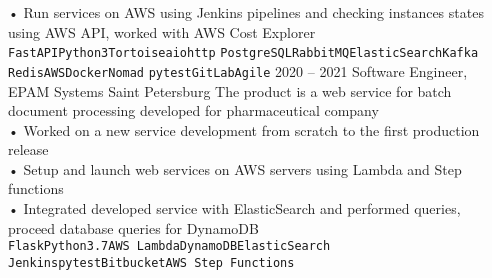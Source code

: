 {\begin{entrylist}
{            • Run services on AWS using Jenkins pipelines and checking instances states using AWS API, worked with AWS Cost Explorer \\
			\texttt{FastAPI}\slashsep\texttt{Python3}\slashsep\texttt{Tortoise}\slashsep\texttt{aiohttp}\slashsep
			\texttt{PostgreSQL}\slashsep\texttt{RabbitMQ}\slashsep\texttt{ElasticSearch}\slashsep\texttt{Kafka}
			\slashsep\texttt{Redis}\slashsep\texttt{AWS}\slashsep\texttt{Docker}\slashsep\texttt{Nomad}\slashsep
			\texttt{pytest}\slashsep\texttt{GitLab}\slashsep\texttt{Agile}
		}
		\entry
		{2020 – 2021}
		{Software Engineer, EPAM Systems}
		{Saint Petersburg}
		{
		    The product is a web service for batch document processing developed for pharmaceutical company \\
			• Worked on a new service development from scratch to the first production release \\
            • Setup and launch web services on AWS servers using Lambda and Step functions \\
            • Integrated developed service with ElasticSearch and performed queries, proceed database queries for DynamoDB \\
			\texttt{Flask}\slashsep\texttt{Python3.7}\slashsep\texttt{AWS Lambda}\slashsep\texttt{DynamoDB}\slashsep\texttt{ElasticSearch}\\
			\texttt{Jenkins}\slashsep\texttt{pytest}\slashsep\texttt{Bitbucket}\slashsep\texttt{AWS Step Functions}
		}
	\end{entrylist}
}

\newcommand{\cvtemplateeducation}{Education}
\newcommand{\cveducation}{
	\begin{entrylist}
	    \entry
		{2018}
		{Python course, EPAM Systems}
		{Saint Petersburg}
		{
			During the course, all main Python topics have been learnt and put into practice.
			Developed a web service for getting some statistics from external API and displaying it in graphs view.\\
			\texttt{Python3}\slashsep\texttt{Flask}
		}
		\entry
		{2014 – 2020}
		{Bachelor/Master's Degrees in Software Engineering, ITMO University}
		{Saint Petersburg}
		{
			Studied Software Engineering in ITMO University.
			The final project was a web service for saving educational results [certificates] based on Blockchain technology.\\
			\texttt{Python3}\slashsep\texttt{Django}\slashsep\texttt{SQLite}
		}
	\end{entrylist}
}

\newcommand{\cvtemplatecontacts}{Contacts}
\newcommand{\cvcontacts}{
	\icontext{At}{12}{\href{mailto:valeriiashestakova@gmail.com}{valeriiashestakova@gmail.com}}\\
	\icontext{Linkedin}{12}{\href{https://www.linkedin.com/in/lerushe/}{@lerushe}}\\
}
\newcommand{\cvtemplatelanguages}{Languages}
\newcommand{\cvlanguages}{
	\bubbles{
    	5/Russian,
    	4/English
	}{}
}
